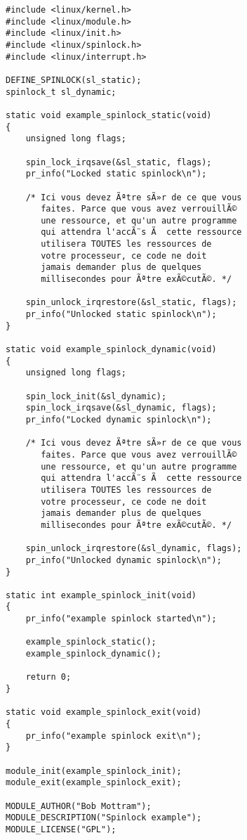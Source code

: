 \documentclass[11pt]{article}
\begin{document}
\begin{verbatim}
#include <linux/kernel.h>
#include <linux/module.h>
#include <linux/init.h>
#include <linux/spinlock.h>
#include <linux/interrupt.h>

DEFINE_SPINLOCK(sl_static);
spinlock_t sl_dynamic;

static void example_spinlock_static(void)
{
    unsigned long flags;

    spin_lock_irqsave(&sl_static, flags);
    pr_info("Locked static spinlock\n");

    /* Ici vous devez Ãªtre sÃ»r de ce que vous
       faites. Parce que vous avez verrouillÃ©
       une ressource, et qu'un autre programme
       qui attendra l'accÃ¨s Ã  cette ressource
       utilisera TOUTES les ressources de
       votre processeur, ce code ne doit
       jamais demander plus de quelques
       millisecondes pour Ãªtre exÃ©cutÃ©. */

    spin_unlock_irqrestore(&sl_static, flags);
    pr_info("Unlocked static spinlock\n");
}

static void example_spinlock_dynamic(void)
{
    unsigned long flags;

    spin_lock_init(&sl_dynamic);
    spin_lock_irqsave(&sl_dynamic, flags);
    pr_info("Locked dynamic spinlock\n");

    /* Ici vous devez Ãªtre sÃ»r de ce que vous
       faites. Parce que vous avez verrouillÃ©
       une ressource, et qu'un autre programme
       qui attendra l'accÃ¨s Ã  cette ressource
       utilisera TOUTES les ressources de
       votre processeur, ce code ne doit
       jamais demander plus de quelques
       millisecondes pour Ãªtre exÃ©cutÃ©. */

    spin_unlock_irqrestore(&sl_dynamic, flags);
    pr_info("Unlocked dynamic spinlock\n");
}

static int example_spinlock_init(void)
{
    pr_info("example spinlock started\n");

    example_spinlock_static();
    example_spinlock_dynamic();

    return 0;
}

static void example_spinlock_exit(void)
{
    pr_info("example spinlock exit\n");
}

module_init(example_spinlock_init);
module_exit(example_spinlock_exit);

MODULE_AUTHOR("Bob Mottram");
MODULE_DESCRIPTION("Spinlock example");
MODULE_LICENSE("GPL");
\end{verbatim}
\end{document}
